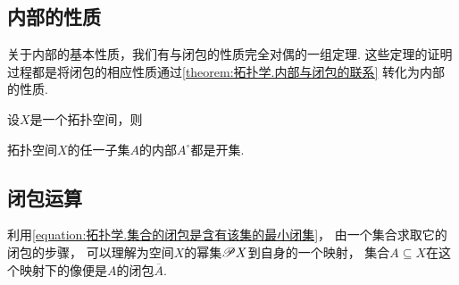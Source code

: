 \subsection{内部的性质}
关于内部的基本性质，我们有与闭包的性质完全对偶的一组定理.
这些定理的证明过程都是将闭包的相应性质通过\cref{theorem:拓扑学.内部与闭包的联系}
转化为内部的性质.

\begin{theorem}\label{theorem:拓扑学.内部的性质}
设\(X\)是一个拓扑空间，则
\end{theorem}

\begin{theorem}\label{theorem:拓扑学.拓扑空间子集内部都是开集}
拓扑空间\(X\)的任一子集\(A\)的内部\(A^\circ\)都是开集.
\end{theorem}

\subsection{闭包运算}
利用\cref{equation:拓扑学.集合的闭包是含有该集的最小闭集}，
由一个集合求取它的闭包的步骤，
可以理解为空间\(X\)的幂集\(\mathscr{P} X\)到自身的一个映射，
集合\(A \subseteq X\)在这个映射下的像便是\(A\)的闭包\(\overline{A}\).

